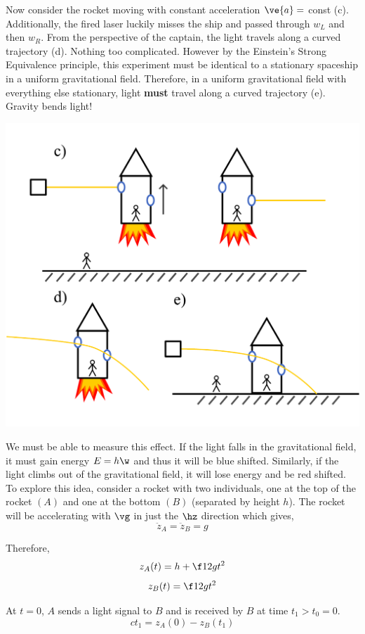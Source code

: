 \documentclass{article}
\begin{document}
Now consider the rocket moving with constant acceleration $\ve{a} =$ const (c). Additionally, the fired laser luckily misses the ship and passed through $w_L$ and then $w_R$. From the perspective of the captain, the light travels along a curved trajectory (d). Nothing too complicated. However by the Einstein's Strong Equivalence principle, this experiment must be identical to a stationary spaceship in a uniform gravitational field. Therefore, in a uniform gravitational field with everything else stationary, light \textbf{must} travel along a curved trajectory (e). Gravity bends light!

\begin{center}
    \includegraphics[scale=0.7]{figures/bend_light/constant_a.pdf}
\end{center}

We must be able to measure this effect. If the light falls in the gravitational field, it must gain energy $E = h \w$ and thus it will be blue shifted. Similarly, if the light climbs out of the gravitational field, it will lose energy and be red shifted. To explore this idea, consider a rocket with two individuals, one at the top of the rocket $(A)$ and one at the bottom $(B)$ (separated by height $h$). The rocket will be accelerating with $\vg$ in just the $\hz$ direction which gives,
\[ \ddot{z}_A = \ddot{z}_B = g \]

Therefore,
\[ z_A(t) = h + \f12 g t^2 \]
\[ z_B(t) = \f12 g t^2 \]

At $t=0$, $A$ sends a light signal to $B$ and is received by $B$ at time $t_1 > t_0 = 0$.
\[ ct_1 = z_A(0) - z_B(t_1) \]
\end{document}
